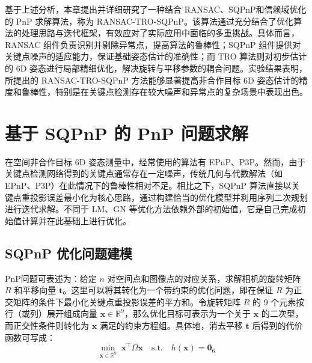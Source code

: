 基于上述分析，本章提出并详细研究了一种结合 RANSAC、SQPnP和信赖域优化的 PnP 求解算法，称为 RANSAC-TRO-SQPnP。该算法通过充分结合了优化算法的处理思路与迭代框架，有效应对了实际应用中面临的多重挑战。具体而言，RANSAC 组件负责识别并剔除异常点，提高算法的鲁棒性；SQPnP 组件提供对关键点噪声的适应能力，保证基础姿态估计的准确性；而 TRO 算法则对初步估计的 6D 姿态进行局部精细优化，解决旋转与平移参数的耦合问题。实验结果表明，所提出的 RANSAC-TRO-SQPnP 方法能够显著提高非合作目标 6D 姿态估计的精度和鲁棒性，特别是在关键点检测存在较大噪声和异常点的复杂场景中表现出色。



\section{基于 SQPnP 的 PnP 问题求解}
\label{sec:RANSAC-TRO-SQPnP:SQPnP}

在空间非合作目标 6D 姿态测量中，经常使用的算法有 EPnP、P3P。然而，由于关键点检测网络得到的关键点通常存在一定噪声，传统几何与代数解法（如 EPnP、P3P）在此情况下的鲁棒性相对不足。相比之下，SQPnP 算法\cite{terzakis2020consistently}直接以关键点重投影误差最小化为核心思路，通过构建恰当的优化模型并利用序列二次规划进行迭代求解。不同于 LM、GN 等优化方法依赖外部的初始值，它是自己完成初始值计算并在此基础上进行优化。




\subsection{SQPnP 优化问题建模}
PnP问题可表述为：给定 $n$ 对空间点和图像点的对应关系，求解相机的旋转矩阵 $R$ 和平移向量 $\mathbf{t}$。这里可以将其转化为一个带约束的优化问题，即在保证 $R$ 为正交矩阵的条件下最小化关键点重投影误差的平方和。令旋转矩阵 $R$ 的 9 个元素按行（或列）展开组成向量 $\mathbf{x}\in\mathbb{R}^9$，那么优化目标可表示为一个关于 $\mathbf{x}$ 的二次型，而正交性条件则转化为 $\mathbf{x}$ 满足的约束方程组。具体地，消去平移 $\mathbf{t}$ 后得到的代价函数可写成：
\begin{equation}
	\min_{\mathbf{x}\in\mathbb{R}^9}\;
	\mathbf{x}^{\top}\Omega\mathbf{x}
	\quad\text{s.t.}\quad
	h(\mathbf{x})=\mathbf{0}_6
\end{equation}

